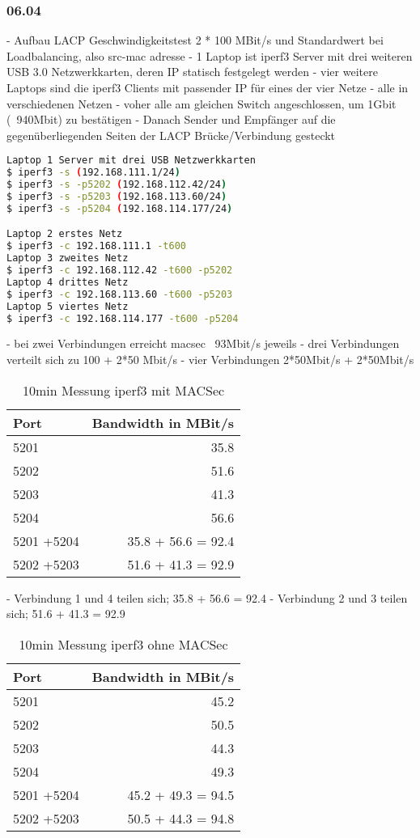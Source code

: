 \documentclass[english,runningheads,a4paper]{llncs}[2018/03/10]
\begin{document}
\subsubsection{06.04}
- Aufbau LACP Geschwindigkeitstest 2 * 100 MBit/s und Standardwert bei Loadbalancing, also src-mac adresse
- 1 Laptop ist iperf3 Server mit drei weiteren USB 3.0 Netzwerkkarten, deren IP statisch festgelegt werden
- vier weitere Laptops sind die iperf3 Clients mit passender IP für eines der vier Netze
- alle in verschiedenen Netzen 
- voher alle am gleichen Switch angeschlossen, um 1Gbit (~940Mbit) zu bestätigen
- Danach Sender und Empfänger auf die gegenüberliegenden Seiten der LACP Brücke/Verbindung gesteckt
\begin{lstlisting}[language=bash]
Laptop 1 Server mit drei USB Netzwerkkarten
$ iperf3 -s (192.168.111.1/24)
$ iperf3 -s -p5202 (192.168.112.42/24)
$ iperf3 -s -p5203 (192.168.113.60/24)
$ iperf3 -s -p5204 (192.168.114.177/24)

Laptop 2 erstes Netz
$ iperf3 -c 192.168.111.1 -t600
Laptop 3 zweites Netz
$ iperf3 -c 192.168.112.42 -t600 -p5202
Laptop 4 drittes Netz
$ iperf3 -c 192.168.113.60 -t600 -p5203
Laptop 5 viertes Netz
$ iperf3 -c 192.168.114.177 -t600 -p5204
\end{lstlisting}
- bei zwei Verbindungen erreicht macsec ~93Mbit/s jeweils
- drei Verbindungen verteilt sich zu 100 + 2*50 Mbit/s
- vier Verbindungen 2*50Mbit/s + 2*50Mbit/s
\begin{table}
	\caption{10min Messung iperf3 mit MACSec}
	\label{tab:iperf3}
	\centering
	\begin{tabular}{lr}
		\toprule
		Port & Bandwidth in MBit/s\\
		\midrule
		5201      & 35.8      \\
		5202     & 51.6     \\
		5203      & 41.3      \\
		5204     & 56.6     \\
		\bottomrule
		5201 +5204     & 35.8 + 56.6 = 92.4      \\
		5202 +5203     & 51.6 + 41.3 = 92.9      \\
	\end{tabular}
\end{table}
- Verbindung 1 und 4 teilen sich; 35.8 + 56.6 = 92.4
- Verbindung 2 und 3 teilen sich; 51.6 + 41.3 = 92.9

\begin{table}
	\caption{10min Messung iperf3 ohne MACSec}
	\label{tab:iperf3}
	\centering
	\begin{tabular}{lr}
		\toprule
		Port & Bandwidth in MBit/s\\
		\midrule
		5201      & 45.2      \\
		5202     & 50.5    \\
		5203      & 44.3      \\
		5204     & 49.3     \\
		\bottomrule
		5201 +5204     & 45.2 + 49.3 = 94.5      \\
		5202 +5203     & 50.5 + 44.3 = 94.8      \\
	\end{tabular}
\end{table}
\end{document}
